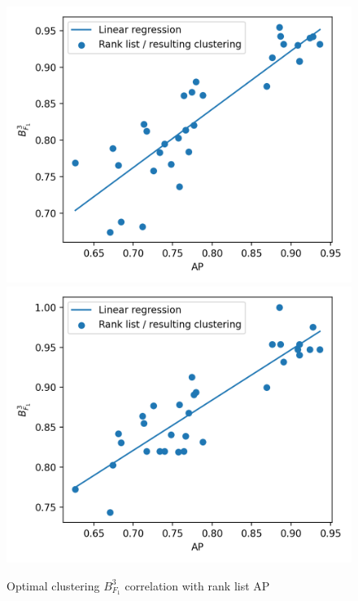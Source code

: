 \begin{figure}
  \caption{Optimal clustering $B^3_{F_1}$ correlation with rank list AP}
  \label{fig:correlation_average_precision_b3f1}

  \includegraphics[width=\linewidth]{img/correlation_average_precision_b3f1_0.png}
  \includegraphics[width=\linewidth]{img/correlation_average_precision_b3f1_1.png}

\end{figure}
